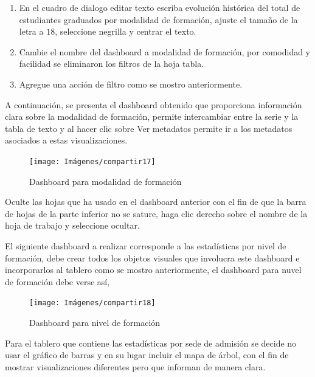 \documentclass[
]{book}
\begin{document}
\begin{enumerate}
\def\labelenumi{\arabic{enumi}.}
\setcounter{enumi}{11}
\item
  En el cuadro de dialogo editar texto escriba evolución histórica del total de estudiantes graduados por modalidad de formación, ajuste el tamaño de la letra a \(18\), seleccione negrilla y centrar el texto.
\item
  Cambie el nombre del dashboard a modalidad de formación, por comodidad y facilidad se eliminaron los filtros de la hoja tabla.
\item
  Agregue una acción de filtro como se mostro anteriormente.
\end{enumerate}

A continuación, se presenta el dashboard obtenido que proporciona información clara sobre la modalidad de formación, permite intercambiar entre la serie y la tabla de texto y al hacer clic sobre Ver metadatos permite ir a los metadatos asociados a estas visualizaciones.

\begin{figure}

{\centering \texttt{[image: Imágenes/compartir17]} 

}

\caption{Dashboard para modalidad de formación}\label{fig:tableromodalidaddeformacion-fig}
\end{figure}

Oculte las hojas que ha usado en el dashboard anterior con el fin de que la barra de hojas de la parte inferior no se sature, haga clic derecho sobre el nombre de la hoja de trabajo y seleccione ocultar.

El siguiente dashboard a realizar corresponde a las estadísticas por nivel de formación, debe crear todos los objetos visuales que involucra este dashboard e incorporarlos al tablero como se mostro anteriormente, el dashboard para nuvel de formación debe verse así,

\begin{figure}

{\centering \texttt{[image: Imágenes/compartir18]} 

}

\caption{Dashboard para nivel de formación}\label{fig:tableroniveldefromacion-fig}
\end{figure}

Para el tablero que contiene las estadísticas por sede de admisión se decide no usar el gráfico de barras y en su lugar incluir el mapa de árbol, con el fin de mostrar visualizaciones diferentes pero que informan de manera clara.
\end{document}

